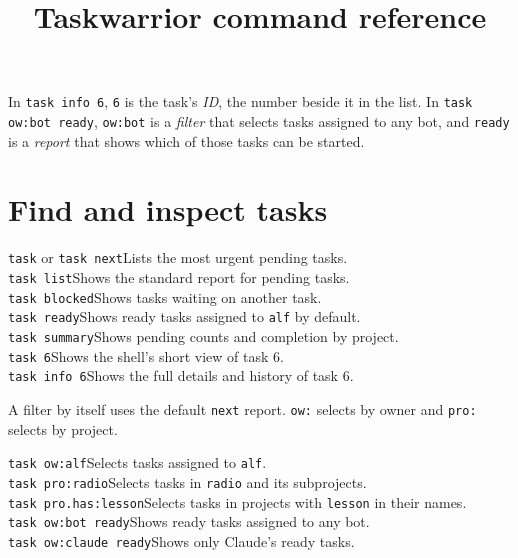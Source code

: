 \documentclass[11pt,a4paper]{article}
\title{Taskwarrior command reference}
\author{}
\date{}
\begin{document}
\maketitle

In \texttt{\textcolor{cmd}{task} \textcolor{sub}{info} 6}, \texttt{6} is the task's \emph{ID}, the number beside it in the list. In \texttt{\textcolor{cmd}{task} \textcolor{attr}{ow:bot} \textcolor{sub}{ready}}, \texttt{\textcolor{attr}{ow:bot}} is a \emph{filter} that selects tasks assigned to any bot, and \texttt{\textcolor{sub}{ready}} is a \emph{report} that shows which of those tasks can be started.

\section*{Find and inspect tasks}

\begin{flushleft}
\texttt{\textcolor{cmd}{task}} or \texttt{\textcolor{cmd}{task} \textcolor{sub}{next}}\quad Lists the most urgent pending tasks. \\
\texttt{\textcolor{cmd}{task} \textcolor{sub}{list}}\quad Shows the standard report for pending tasks. \\
\texttt{\textcolor{cmd}{task} \textcolor{sub}{blocked}}\quad Shows tasks waiting on another task. \\
\texttt{\textcolor{cmd}{task} \textcolor{sub}{ready}}\quad Shows ready tasks assigned to \texttt{alf} by default. \\
\texttt{\textcolor{cmd}{task} \textcolor{sub}{summary}}\quad Shows pending counts and completion by project. \\
\texttt{\textcolor{cmd}{task} 6}\quad Shows the shell's short view of task 6. \\
\texttt{\textcolor{cmd}{task} \textcolor{sub}{info} 6}\quad Shows the full details and history of task 6. \\
\end{flushleft}

A filter by itself uses the default \texttt{\textcolor{sub}{next}} report. \texttt{\textcolor{attr}{ow:}} selects by owner and \texttt{\textcolor{attr}{pro:}} selects by project.

\begin{flushleft}
\texttt{\textcolor{cmd}{task} \textcolor{attr}{ow:alf}}\quad Selects tasks assigned to \texttt{alf}. \\
\texttt{\textcolor{cmd}{task} \textcolor{attr}{pro:radio}}\quad Selects tasks in \texttt{radio} and its subprojects. \\
\texttt{\textcolor{cmd}{task} \textcolor{attr}{pro.has:lesson}}\quad Selects tasks in projects with \texttt{lesson} in their names. \\
\texttt{\textcolor{cmd}{task} \textcolor{attr}{ow:bot} \textcolor{sub}{ready}}\quad Shows ready tasks assigned to any bot. \\
\texttt{\textcolor{cmd}{task} \textcolor{attr}{ow:claude} \textcolor{sub}{ready}}\quad Shows only Claude's ready tasks. \\
\end{flushleft}
\end{document}
